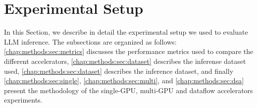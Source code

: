 
\section{Experimental Setup}
\label{chap:exp}

In this Section, we describe in detail the experimental setup we used to evaluate LLM inference.
The subsections are organized as follows: 
\ref{chap:methods:sec:metrics} discusses the performance metrics used to compare the different accelerators, 
\ref{chap:methods:sec:dataset} describes the inferense dataset used,
\ref{chap:methods:sec:dataset} describes the inference dataset, and finally \ref{chap:methods:sec:single}, \ref{chap:methods:sec:multi}, and   \ref{chap:methods:sec:dsa} present the methodology of the single-GPU, multi-GPU and dataflow accelerators experiments.





